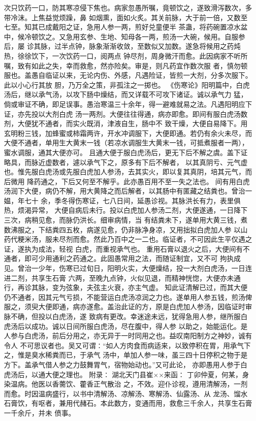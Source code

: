 \documentclass[a4paper,12pt,UTF8,twoside]{ctexbook}
\begin{document}
次只饮药一口，防其寒凉侵下焦也。病家忽愚所嘱，竟顿饮之，遂致滑泻数次，多带冷沫。上焦益觉烦躁，鼻 
如烟熏，面如火炙。其关前脉，大于前一倍，又数至七至。知其已成戴阳之证，急用人参一两，煎好兑童便半 
茶蛊，将药碗置凉水盆中，候冷顿饮之。又急用玄参、生地、知母各一两，煎汤一大碗，候用。自服参后，屡 
诊其脉，过半点钟，脉象渐渐收敛，至数似又加数。遂急将候用之药炖热，徐徐饮下，一次饮药一口，阅两点 
钟尽剂，周身微汗而愈。此因病家不听所嘱，致有如此之失，幸而救愈，然亦险矣。审是，则凡药宜作数次服 
者，慎勿顿服也。盖愚自临证以来，无论内伤、外感，凡遇险证，皆煎一大剂，分多次服下。此以小心行其放 
胆，乃万全之策，非孤注之一掷也。 
《伤寒论》阳明篇中，白虎汤后，继以承气汤，以攻下肠中燥结，而又详载不可攻下诸证。诚以承气力 
猛，倘或审证不确，即足误事。愚治寒温三十余年，得一避难就易之法。凡遇阳明应下证，亦先投以大剂白虎 
汤一两剂。大便往往得通，病亦即愈。即间有服白虎汤数剂，大便犹不通者，而实火既消，津液自生，肠中不 
致干燥，大便自易降下。用玄明粉三钱，加蜂蜜或柿霜两许，开水冲调服下，大便即通。若仍有余火未尽，而 
大便不通者，单用生大黄末一钱（若凉水调服生大黄末一钱，可抵煮服者一两），蜜水调服，通其大便亦可。 
且通大便于服白虎汤后，更无下后不解之虞。盖下证略具，而脉近虚数者，遽以承气下之，原多有下后不解者， 
以其真阴亏、元气虚也。惟先服白虎汤或先服白虎加人参汤，去其实火，即以复其真阴，培其元气，而后微用 
降药通之，下后又何至不解乎。此亦愚百用不至一失之法也。 
间有用白虎汤润下大便，病仍不解，用大黄降之而后解者，以其肠中有匿藏之结粪也。曾治一媪，年七十 
余，季冬得伤寒证，七八日间，延愚诊视。其脉洪长有力，表里俱热，烦渴异常， 
大便自病后未行。投以白虎加人参汤二剂，大便遂通，一日降下三次，病稍见愈，而脉仍洪长。细审病情，当 
有结粪未下，遂单用大黄三钱，煮数沸服之，下结粪四五枚，病遂见愈，仍非脉净身凉，又用拙拟白虎加人参 
以山药代粳米汤，服未尽剂而愈。然此乃百中之一二也。临证者，不可因此生平仅遇之证，遂执为成法，轻视 
白虎，而重视承气也。 
重用石膏以退火之后，大便间有不通者，即可少用通利之药通之。此固愚常用之法，而随证制宜，又不可 
拘执成见。曾治一少年，伤寒已过旬日，阳明火实，大便燥结，投一大剂白虎汤，一日连进二剂，共享生石膏 
六两，至晚九点钟，火似见退，而精神恍惚，大便亦未通行，再诊其脉，变为弦象，夫弦主火衰，亦主气虚。 
知此证清解已过，而其大便仍不通者，因其元气亏损，不能营运白虎汤凉润之力也。遂单用人参五钱，煎汤俾 
服之，须臾大便即通，病亦遂愈。盖治此证的方，原是白虎加人参汤，因临证时审脉不确，但投以白虎汤，遂 
致病有更改。幸迷途未远，犹得急用人参，继所服白虎汤后以成功。诚以日间所服白虎汤，尽在腹中，得人参 
以助之，始能运化。是人参与白虎汤，前后分用之，亦无异于一时同用之也。益叹南阳制方之神妙，诚有令人 
不可思议者也。吴又可谓∶“如人方肉食而病适来，以致停积在胃，用承气下之，惟是臭水稀粪而已，于承气 
汤中，单加人参一味，虽三四十日停积之物于是方下。盖承气借人参之力鼓舞胃气，宿物始动也。”又可此论， 
亦即愚用人参于白虎汤后，以通大便之理也。 
附录∶ 
湖北天门县崔××来函∶ 
丁卯仲夏，何某，身染温病。他医以香薷饮、藿香正气散治 
之，不效。迎仆诊视，遵用清解汤，一剂而愈。时因温病盛行，以书中清解汤、凉解汤、寒解汤、仙露汤、从 
龙汤、馏水石膏饮，有呕者，兼用代赭石。本此数方，变通而用，救愈三千余人，共享生石膏一千余斤，并未 
偾事。 
\end{document}
